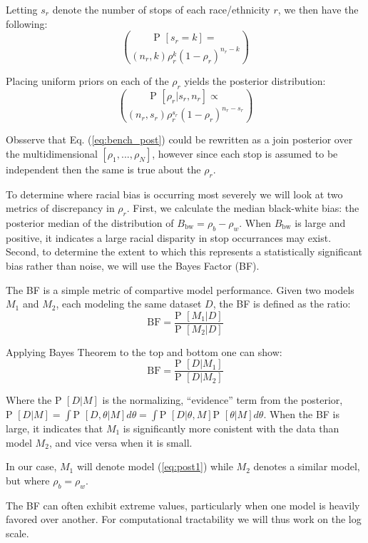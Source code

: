 \documentclass[11pt]{article}
\newcommand{\pr}{\text{P }}
\begin{document}
Letting $s_r$ denote the number of stops of each race/ethnicity $r$, we then have the following:
\begin{equation}
  \label{eq:bench_mod}
  \pr[s_r = k ] = \choose(n_r,k) \rho_r^k ( 1-\rho_r)^{n_r-k}
\end{equation}

Placing uniform priors on each of the $\rho_r$ yields the posterior distribution:
\begin{equation}
  \label{eq:bench_post}
  \pr[\rho_r | s_r, n_r] \propto \choose(n_r,s_r) \rho_r^{s_r} ( 1-\rho_r)^{n_r-s_r}
\end{equation}

Obsserve that Eq. (\ref{eq:bench_post}) could be rewritten as a join posterior over the multidimensional $[\rho_1,...,\rho_N]$, however since each stop is assumed to be independent then the same is true about the $\rho_r$.

To determine where racial bias is occurring most severely we will look at two metrics of discrepancy in $\rho_r$. First, we calculate the median black-white bias: the posterior median of the distribution of $B_{\text{bw}} = \rho_b - \rho_w$. When $B_{\text{bw}}$ is large and positive, it indicates a large racial disparity in stop occurrances may exist. Second, to determine the extent to which this represents a statistically significant bias rather than noise, we will use the Bayes Factor (BF).

The BF is a simple metric of compartive model performance. Given two models $M_1$ and $M_2$, each modeling the same dataset $D$, the BF is defined as the ratio:
\[
\text{BF} = \frac{\pr[M_1|D]}{\pr[M_2|D]}
\]

Applying Bayes Theorem to the top and bottom one can show:
\[
\text{BF} = \frac{ \pr[D|M_1] }{\pr[D|M_2]}
\]

Where the $\pr[D|M]$ is the normalizing, ``evidence'' term from the posterior, $\pr[D|M] = \int \pr[D,\theta|M] d \theta = \int \pr[D|\theta,M] \pr[\theta|M] d \theta$. When the BF is large, it indicates that $M_1$ is significantly more conistent with the data than model $M_2$, and vice versa when it is small.

In our case, $M_1$ will denote model (\ref{eq:post1}) while $M_2$ denotes a similar model, but where $\rho_b = \rho_w$.  

The BF can often exhibit extreme values, particularly when one model is heavily favored over another. For computational tractability we will thus work on the log scale.
\end{document}

